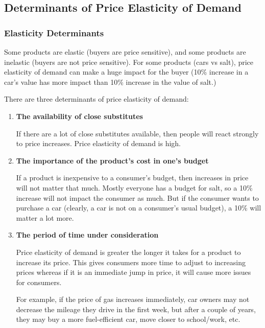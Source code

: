 \documentclass[a4paper, 12pt] {article}
\begin{document}
\subsection{Determinants of Price Elasticity of Demand}
\subsubsection{Elasticity Determinants}
Some products are elastic (buyers are price sensitive), and some products are 
inelastic (buyers are not price sensitive). For some products (cars vs salt), 
price elasticity of demand can make a huge impact for the buyer (10\% increase 
in a car's value has more impact than 10\% increase in the value of salt.)

There are three determinants of price elasticity of demand:
\begin{enumerate}
    \item \textbf{The availability of close substitutes}
        
        If there are a lot of close substitutes available, then people will
        react strongly to price increases. Price elasticity of demand is high.

    \item \textbf{The importance of the product's cost in one's budget}

        If a product is inexpensive to a consumer's budget, then increases in
        price will not matter that much. Mostly everyone has a budget for salt,
        so a 10\% increase will not impact the consumer as much. But if the
        consumer wants to purchase a car (clearly, a car is not on a consumer's 
        usual budget), a 10\% will matter a lot more.

    \item \textbf{The period of time under consideration}

        Price elasticity of demand is greater the longer it takes for a product
        to increase its price. This gives consumers more time to adjust to
        increasing prices whereas if it is an immediate jump in price, it will
        cause more issues for consumers.

        For example, if the price of gas increases immediately, car owners may
        not decrease the mileage they drive in the first week, but after a
        couple of years, they may buy a more fuel-efficient car, move closer to
        school/work, etc.
\end{enumerate}
\end{document}
